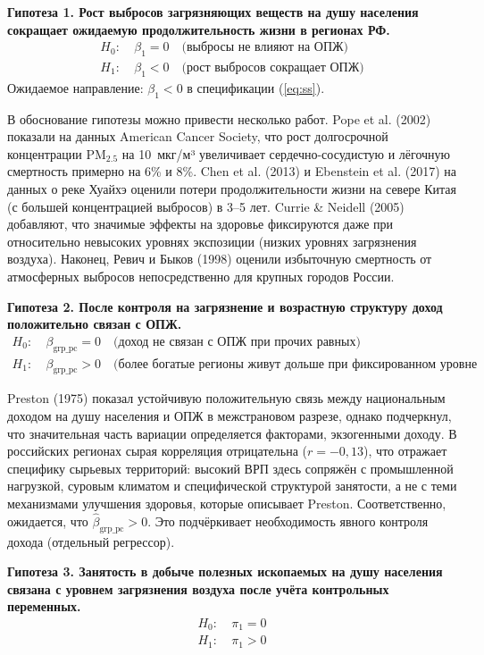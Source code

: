 \documentclass[10pt,a4paper]{article}
\begin{document}
\textbf{Гипотеза 1. Рост выбросов загрязняющих веществ на душу населения сокращает ожидаемую продолжительность жизни в регионах РФ.}
\begin{align*}
H_0\colon\ & \beta_1 = 0 \quad \text{(выбросы не влияют на ОПЖ)}\\
H_1\colon\ & \beta_1 < 0 \quad \text{(рост выбросов сокращает ОПЖ)}
\end{align*}
Ожидаемое направление: $\beta_1 < 0$ в спецификации (\ref{eq:ss}).

В обоснование гипотезы можно привести несколько работ. Pope et al. (2002) показали на данных American Cancer Society, что рост долгосрочной концентрации $\text{PM}_{2.5}$ на 10~мкг/м³ увеличивает сердечно-сосудистую и лёгочную смертность примерно на 6\% и 8\%. Chen et al. (2013) и Ebenstein et al. (2017) на данных о реке Хуайхэ оценили потери продолжительности жизни на севере Китая (с большей концентрацией выбросов) в 3--5 лет. Currie \& Neidell (2005) добавляют, что значимые эффекты на здоровье фиксируются даже при относительно невысоких уровнях экспозиции (низких уровнях загрязнения воздуха). Наконец, Ревич и Быков (1998) оценили избыточную смертность от атмосферных выбросов непосредственно для крупных городов России.

\textbf{Гипотеза 2. После контроля на загрязнение и возрастную структуру доход положительно связан с ОПЖ.}
\begin{align*}
H_0\colon\ & \beta_{\text{grp\_pc}} = 0 \quad \text{(доход не связан с ОПЖ при прочих равных)}\\
H_1\colon\ & \beta_{\text{grp\_pc}} > 0 \quad \text{(более богатые регионы живут дольше при фиксированном уровне загрязнения)}
\end{align*}

Preston (1975) показал устойчивую положительную связь между национальным доходом на душу населения и ОПЖ в межстрановом разрезе, однако подчеркнул, что значительная часть вариации определяется факторами, экзогенными доходу. В российских регионах сырая корреляция отрицательна ($r = -0{,}13$), что отражает специфику сырьевых территорий: высокий ВРП здесь сопряжён с промышленной нагрузкой, суровым климатом и специфической структурой занятости, а не с теми механизмами улучшения здоровья, которые описывает Preston. Соответственно, ожидается, что $\hat\beta_{\text{grp\_pc}} > 0$. Это подчёркивает необходимость явного контроля дохода (отдельный регрессор).

\textbf{Гипотеза 3. Занятость в добыче полезных ископаемых на душу населения связана с уровнем загрязнения воздуха после учёта контрольных переменных.}
\begin{align*}
H_0\colon\ & \pi_1 = 0\\
H_1\colon\ & \pi_1 > 0
\end{align*}
\end{document}
